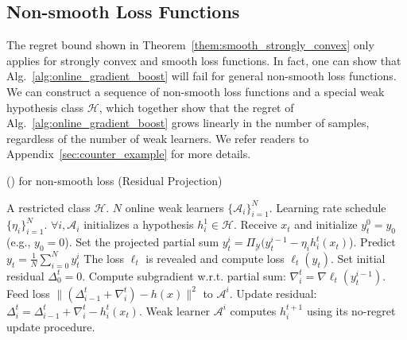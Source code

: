 \subsection{Non-smooth Loss Functions}
\label{subsec:non-smooth}
The regret bound shown in Theorem~\ref{them:smooth_strongly_convex} only applies for strongly convex and smooth loss functions. In fact, one can show that Alg.~\ref{alg:online_gradient_boost} will fail for general non-smooth loss functions. We can construct a sequence of non-smooth loss functions and a special weak hypothesis class $\mathcal{H}$, which together show that the regret of Alg.~\ref{alg:online_gradient_boost} grows linearly in the number of samples, regardless of the number of weak learners. We refer readers to Appendix~\ref{sec:counter_example} for more details. 

\begin{algorithm}[tb]
\caption{\algname (\algshort) for non-smooth loss (Residual Projection)}
 \label{alg:online_gradient_boost_non_smooth_residual}
\begin{algorithmic}[1]
   A restricted  class $\mathcal{H}$. $N$ online weak learners $\{\mathcal{A}_i\}_{i=1}^N$. Learning rate schedule $\{\eta_i\}_{i=1}^N$.
  \STATE  $\forall i,\mathcal{A}_i$ initializes a hypothesis $h_{i}^1 \in \mathcal{H}$.
    \STATE Receive $x_t$ and initialize $y_t^{0} = y_0$ (e.g., $y_{0} = 0$). 
    \label{line:GD}
        \STATE Set the projected partial sum $y_t^{i} = \Pi_{\mathcal{Y}}(y_t^{i-1} - \eta_i h_i^t(x_t)$).
    \ENDFOR
    \STATE Predict ${y}_t = \frac{1}{N}\sum_{i=0}^N {y}_t^i$
    \STATE The loss $\ell_t$ is revealed and compute loss $\ell_t(y_t)$.
    \STATE Set initial residual $\Delta_0^t = 0$. 
        \STATE Compute subgradient w.r.t. partial sum: 
            $\nabla_i^t = \nabla\ell_t(y_t^{i-1})$. 
        \STATE Feed loss $\big\|(\Delta^t_{i-1} + \nabla^t_i) - h(x)\big\|^2$ to $\mathcal{A}^i$.
        \label{line:feed_residual_loss}
        \STATE Update residual: $\Delta_i^t = \Delta^t_{i-1} + \nabla^t_i - h_i^t(x_t)$.
        \label{line:residual_update}
        \STATE Weak learner $\mathcal{A}^i$ computes $h_i^{t+1}$ using its no-regret update procedure.
    \ENDFOR
 \ENDFOR
\end{algorithmic}
\end{algorithm}

